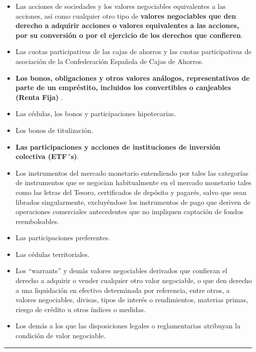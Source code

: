 \documentclass[
  letterpaper,
  DIV=11,
  numbers=noendperiod]{scrreprt}
\begin{document}
\begin{tcolorbox}[enhanced jigsaw, left=2mm, opacityback=0, colback=white, breakable, arc=.35mm, bottomrule=.15mm, rightrule=.15mm, toprule=.15mm, leftrule=.75mm, colframe=quarto-callout-tip-color-frame]
\begin{minipage}[t]{\textwidth - 5.5mm}
\begin{itemize}
\item
  Las acciones de sociedades y los valores negociables equivalentes a
  las acciones, así como cualquier otro tipo de \textbf{valores
  negociables que den derecho a adquirir acciones o valores equivalentes
  a las acciones, por su conversión o por el ejercicio de los derechos
  que confieren}.
\item
  Las cuotas participativas de las cajas de ahorros y las cuotas
  participativas de asociación de la Confederación Española de Cajas de
  Ahorros.
\item
  \textbf{Los bonos, obligaciones y otros valores análogos,
  representativos de parte de un empréstito, incluidos los convertibles
  o canjeables (Renta Fija)} .
\item
  Las cédulas, los bonos y participaciones hipotecarias.
\item
  Los bonos de titulización.
\item
  \textbf{Las participaciones y acciones de instituciones de inversión
  colectiva (ETF´s)}.
\item
  Los instrumentos del mercado monetario entendiendo por tales las
  categorías de instrumentos que se negocian habitualmente en el mercado
  monetario tales como las letras del Tesoro, certificados de depósito y
  pagarés, salvo que sean librados singularmente, excluyéndose los
  instrumentos de pago que deriven de operaciones comerciales
  antecedentes que no impliquen captación de fondos reembolsables.
\item
  Las participaciones preferentes.
\item
  Las cédulas territoriales.
\item
  Los ``warrants'' y demás valores negociables derivados que confieran
  el derecho a adquirir o vender cualquier otro valor negociable, o que
  den derecho a una liquidación en efectivo determinada por referencia,
  entre otros, a valores negociables, divisas, tipos de interés o
  rendimientos, materias primas, riesgo de crédito u otros índices o
  medidas.
\item
  Los demás a los que las disposiciones legales o reglamentarias
  atribuyan la condición de valor negociable.
\end{itemize}

\end{minipage}%
\end{tcolorbox}

\begin{center}\rule{0.5\linewidth}{0.5pt}\end{center}
\end{document}
